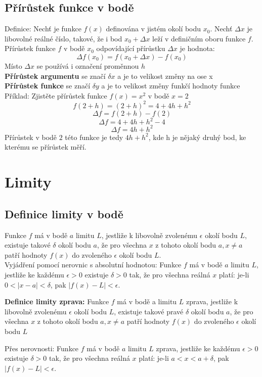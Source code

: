 \documentclass[12pt]{article}
\begin{document}
\subsection*{Přírůstek funkce v bodě}
Definice: Nechť je funkce $f(x)$ definována v jistém okolí bodu $x_0$. Nechť $\Delta x$ je libovolné reálné číslo, takové, že i bod $x_0 + \Delta x$ leží v definičním oboru funkce $f$.
Přírůstek funkce $f$ v bodě $x_0$ odpovídající přírůstku $\Delta x$ je hodnota:
\[\Delta f(x_0) = f(x_0 + \Delta x) - f(x_0)\]
Místo $\Delta x$ se používá i označení proměnnou $h$\\
\textbf{Přírůstek argumentu} se značí $\delta x$ a je to velikost změny na ose x\\
\textbf{Přírůstek funkce} se značí $\delta y$ a je to velikost změny funkčí hodnoty funkce\\
Příklad: Zjistěte přírůstek funkce $f(x) = x^2$ v bodě $x = 2$
\[f(2 + h) = (2 + h)^2 = 4 + 4h + h^2\]
\[\Delta f = f(2 + h) - f(2)\]
\[\Delta f = 4 + 4h + h^2 - 4\]
\[\Delta f = 4h + h^2\]
Přírůstek v bodě $2$ této funkce je tedy $4h + h^2$, kde h je nějaký druhý bod, ke kterému se přírůstek měří. 

\section*{Limity}
\subsection*{Definice limity v bodě}
Funkce $f$ má v bodě $a$ limitu $L$, jestliže k libovolně zvolenému $\epsilon$ okolí bodu $L$, existuje takové $\delta$ okolí bodu $a$, že pro všechna $x$ z tohoto okolí bodu $a, x\neq a$ patří hodnoty $f(x)$ do zvoleného $\epsilon$ okolí bodu $L$.\\

Vyjádření pomocí nerovnic s absolutní hodnotou: Funkce $f$ má v bodě $a$ limitu $L$, jestliže ke každému $\epsilon > 0$ existuje $\delta > 0$ tak, že pro všechna reálná $x$ platí: je-li $0<|x-a|<\delta$, pak $|f(x)-L|<\epsilon$.

\textbf{Definice limity zprava:} Funkce $f$ má v bodě a limitu $L$ zprava, jestliže k libovolně zvolenému
$\epsilon$ okolí bodu $L$,
existuje takové pravé
$\delta$ okolí bodu $a$, že pro všechna $x$ z tohoto okolí bodu $a, x\neq a$ patří
hodnoty $f(x)$ do zvoleného
$\epsilon$ okolí bodu $L$

Přes nerovnosti: Funkce $f$ má v bodě $a$ limitu $L$ zprava, jestliže ke každému $\epsilon>0$ existuje $\delta>0$ tak, že pro všechna reálná $x$ platí: je-li $a<x<a+\delta$, pak $|f(x)-L|<\epsilon$.
\end{document}
